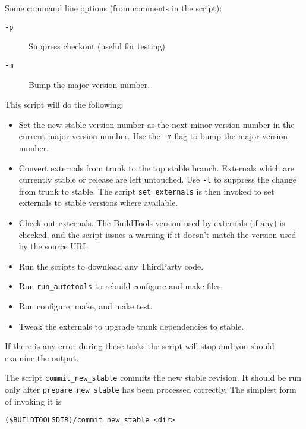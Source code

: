 {Some command line options (from comments in the script):

\begin{description}
  \item[\tt -p]			Suppress checkout (useful for testing)
  \item[\tt -m] 		Bump the major version number.
\end{description}

This script will do the following:

\begin{itemize}
  \item Set the new stable version number as the next minor version number in
    the current major version number. Use the {\tt -m} flag to bump the major
    version number.

  \item Convert externals from trunk to the top stable branch. Externals which
    are currently stable or release are left untouched. Use {\tt -t} to suppress
    the change from trunk to stable. The script {\tt set\_externals} is then invoked to set
    externals to stable versions where available.

  \item Check out externals. The BuildTools version used by externals (if any)
    is checked, and the script issues a warning if it doesn't match the
    version used by the source URL.

 \item Run the scripts to download any ThirdParty code.

  \item Run {\tt run\_autotools} to rebuild configure and make files.

  \item Run configure, make, and make test.

  \item Tweak the externals to upgrade trunk  dependencies to stable.
\end{itemize}

If there is any error during these tasks the script will stop and you should
examine the output.
   
\medskip

The script {\tt commit\_new\_stable} commits the new stable revision. It should be run only after 
{\tt prepare\_new\_stable} has been processed correctly.  
The simplest form of invoking it is

\begin{verbatim}
($BUILDTOOLSDIR)/commit_new_stable <dir>
\end{verbatim}

}
